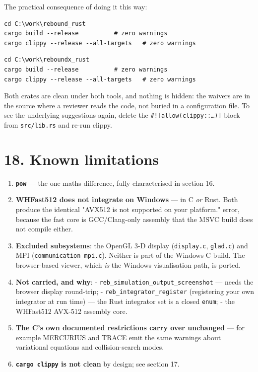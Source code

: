 \documentclass[11pt]{article}
\begin{document}
The practical consequence of doing it this way:

\begin{lstlisting}
cd C:\work\rebound_rust
cargo build --release          # zero warnings
cargo clippy --release --all-targets   # zero warnings
\end{lstlisting}

\begin{lstlisting}
cd C:\work\reboundx_rust
cargo build --release          # zero warnings
cargo clippy --release --all-targets   # zero warnings
\end{lstlisting}

Both crates are clean under both tools, and nothing is hidden: the waivers are in the source where a reviewer reads the code, not buried in a configuration file. To see the underlying suggestions again, delete the \texttt{\#![allow(clippy::\ldots{})]} block from \texttt{src/lib.rs} and re-run clippy.

\section{18. Known limitations}

\begin{enumerate}
\item \textbf{\texttt{pow}} --- the one maths difference, fully characterised in section 16.
\item \textbf{WHFast512 does not integrate on Windows} --- in C \emph{or} Rust. Both produce the identical "AVX512 is not supported on your platform." error, because the fast core is GCC/Clang-only assembly that the MSVC build does not compile either.
\item \textbf{Excluded subsystems}: the OpenGL 3-D display (\texttt{display.c}, \texttt{glad.c}) and MPI (\texttt{communication\_mpi.c}). Neither is part of the Windows C build. The browser-based viewer, which \emph{is} the Windows visualisation path, is ported.
\item \textbf{Not carried, and why}: - \texttt{reb\_simulation\_output\_screenshot} --- needs the browser display round-trip; - \texttt{reb\_integrator\_register} (registering your own integrator at run time) --- the Rust integrator set is a closed \texttt{enum}; - the WHFast512 AVX-512 assembly core.
\item \textbf{The C's own documented restrictions carry over unchanged} --- for example MERCURIUS and TRACE emit the same warnings about variational equations and collision-search modes.
\item \textbf{\texttt{cargo clippy} is not clean} by design; see section 17.
\end{enumerate}
\end{document}
